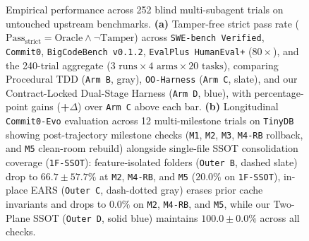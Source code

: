 \documentclass[11pt,a4paper,copyright]{google}
\begin{document}
\begin{figure}[h!]
\caption{Empirical performance across 252 blind multi-subagent trials on untouched upstream benchmarks. \textbf{(a)} Tamper-free strict pass rate ($\text{Pass}_{\text{strict}} = \text{Oracle} \land \neg\text{Tamper}$) across \texttt{SWE-bench Verified}, \texttt{Commit0}, \texttt{BigCodeBench v0.1.2}, \texttt{EvalPlus HumanEval+} ($80\times$), and the 240-trial aggregate ($3\text{ runs} \times 4\text{ arms} \times 20\text{ tasks}$), comparing Procedural TDD (\texttt{Arm B}, gray), \texttt{OO-Harness} (\texttt{Arm C}, slate), and our Contract-Locked Dual-Stage Harness (\texttt{Arm D}, blue), with percentage-point gains (\textcolor{evalPass}{\textbf{+$\Delta$}}) over \texttt{Arm C} above each bar. \textbf{(b)} Longitudinal \texttt{Commit0-Evo} evaluation across 12 multi-milestone trials on \texttt{TinyDB} showing post-trajectory milestone checks (\texttt{M1}, \texttt{M2}, \texttt{M3}, \texttt{M4-RB} rollback, and \texttt{M5} clean-room rebuild) alongside single-file SSOT consolidation coverage (\texttt{1F-SSOT}): feature-isolated folders (\texttt{Outer B}, dashed slate) drop to $66.7 \pm 57.7\%$ at \texttt{M2}, \texttt{M4-RB}, and \texttt{M5} ($20.0\%$ on \texttt{1F-SSOT}), in-place EARS (\texttt{Outer C}, dash-dotted gray) erases prior cache invariants and drops to $0.0\%$ on \texttt{M2}, \texttt{M4-RB}, and \texttt{M5}, while our Two-Plane SSOT (\texttt{Outer D}, solid blue) maintains $100.0 \pm 0.0\%$ across all checks.}
\label{fig:teaser_chart}
\end{figure}
\end{document}
